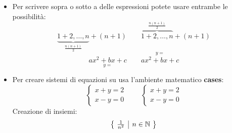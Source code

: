 \documentclass[a4paper,12pt,oneside]{book}
\theoremstyle{plain}
\begin{document}
\begin{itemize}
		\item Per scrivere sopra o sotto a delle espressioni potete usare entrambe le possibilità:
		\[
		\underbrace{1 + 2, \dots, n}_{\frac{n(n+1)}{2}} + (n+1) \qquad \overbrace{1 + 2, \dots, n}^{\frac{n(n+1)}{2}} + (n+1)
		\]
		\[
		\underset{y=}{ax^2 + bx + c} \qquad \overset{y=}{ax^2 + bx + c}
		\]
		
		\item Per creare sistemi di equazioni su usa l'ambiente matematico \textbf{cases}:
		\[
		\begin{cases}
			x + y = 2\\
			x - y = 0
		\end{cases} \qquad \left\{\!\begin{array}{c}
			x + y = 2\\
			x - y = 0
		\end{array}\right.
		\]
		Creazione di insiemi:
		\[
		\left\{\!\begin{array}{c | c}
			\frac{1}{n^2} & n\in\mathbb{N}
		\end{array}\!\right\}
		\]
	\end{itemize}
\end{document}
